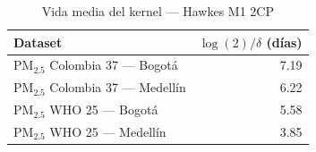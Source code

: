 \begin{table}[htbp]
\centering
\caption{Vida media del kernel --- Hawkes M1 2CP}
\label{tab:hawkes_halflife_2cp}
\begin{tabular}{lr}
\toprule
Dataset & $\log(2)/\delta$ (d\'{i}as) \\
\midrule
PM$_{2.5}$ Colombia 37 --- Bogot\'{a} & 7.19 \\
PM$_{2.5}$ Colombia 37 --- Medell\'{i}n & 6.22 \\
PM$_{2.5}$ WHO 25 --- Bogot\'{a} & 5.58 \\
PM$_{2.5}$ WHO 25 --- Medell\'{i}n & 3.85 \\
\bottomrule
\end{tabular}
\end{table}
